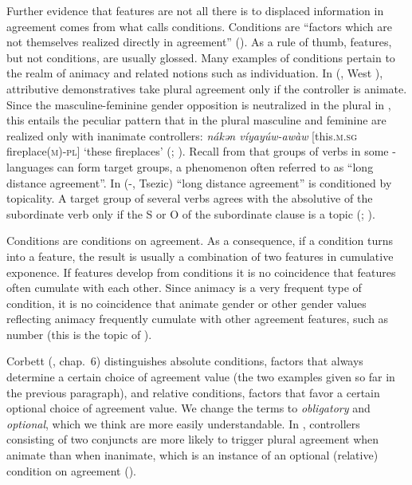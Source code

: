 \documentclass[output=collectionpaper]{langsci/langscibook}
\begin{document}
Further evidence that features are not all there is to displaced information in agreement comes from what \citealt{Corbett2006} calls conditions. Conditions are ``factors which are not themselves realized directly in agreement'' (\citealt[176]{Corbett2006}). As a rule of thumb, features, but not conditions, are usually glossed. Many examples of conditions pertain to the realm of animacy and related notions such as individuation. In  (, West ), attributive demonstratives take plural agreement only if the controller is animate. Since the masculine-feminine gender opposition is neutralized in the plural in , this entails the peculiar pattern that in the plural masculine and feminine are realized only with inanimate controllers: \textit{nákǝn víyayúw-awàw} [this.\textsc{m.sg} fireplace\textsc{(m)-pl}] `these fireplaces' (\citealt[193]{Schuh1998}; \citealt[178]{Corbett2006}). Recall from  that groups of verbs in some - languages can form target groups, a phenomenon often referred to as ``long distance agreement''. In  (-, Tsezic) ``long distance agreement'' is conditioned by topicality. A target group of several verbs agrees with the absolutive of the subordinate verb only if the S or O of the subordinate clause is a topic (\citealt{Polinsky1999}; \citealt[197]{Corbett2006}).

Conditions are conditions on agreement. As a consequence, if a condition turns into a feature, the result is usually a combination of two features in cumulative exponence. If features develop from conditions it is no coincidence that features often cumulate with each other. Since animacy is a very frequent type of condition, it is no coincidence that animate gender or other gender values reflecting animacy frequently cumulate with other agreement features, such as number (this is the topic of ).

Corbett (\citealt*{Corbett2006}, chap.~6) distinguishes absolute conditions, factors that always determine a certain choice of agreement value (the two examples given so far in the previous paragraph), and relative conditions, factors that favor a certain optional choice of agreement value. We change the terms to \emph{obligatory} and \emph{optional}, which we think are more easily understandable. In , controllers consisting of two conjuncts are more likely to trigger plural agreement when animate than when inanimate, which is an instance of an optional (relative) condition on agreement (\citealt[179]{Corbett2006}).
\end{document}
